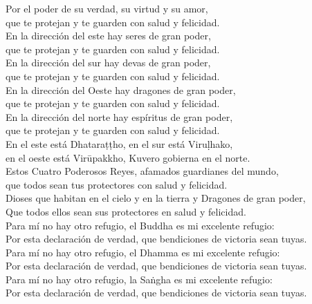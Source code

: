 \begin{onechants}
Por el poder de su verdad, su virtud y su amor,\\
 que te protejan y te guarden con salud y felicidad.\\
En la dirección del este hay seres de gran poder,\\
 que te protejan y te guarden con salud y felicidad.\\
En la dirección del sur hay devas de gran poder, \\
que te protejan y te guarden con salud y felicidad.\\
En la dirección del Oeste hay dragones de gran poder,\\
que te protejan y te guarden con salud y felicidad.\\
En la dirección del norte hay espíritus de gran poder,\\
 que te protejan y te guarden con salud y felicidad.\\
En el este está Dhataraṭṭho, en el sur está Viruḷhako,\\
en el oeste está Virūpakkho, Kuvero gobierna en el norte.\\
Estos Cuatro Poderosos Reyes, afamados guardianes del mundo,\\
 que todos sean tus protectores con salud y felicidad.\\
Dioses que habitan en el cielo y en la tierra y Dragones de gran poder,\\
Que todos ellos sean sus protectores en salud y felicidad.\\
Para mí no hay otro refugio, el Buddha es mi excelente refugio:\\
Por esta declaración de verdad, que bendiciones de victoria sean tuyas.\\
Para mí no hay otro refugio, el Dhamma es mi excelente refugio:\\
Por esta declaración de verdad, que bendiciones de victoria sean tuyas.\\
Para mí no hay otro refugio, la Saṅgha es mi excelente refugio:\\
Por esta declaración de verdad, que bendiciones de victoria sean tuyas.\\

\end{onechants}

\clearpage

\paliText
\enlargethispage{2\baselineskip}
\savenotes

